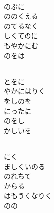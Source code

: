 \documentclass[10pt,b5j]{tarticle} %
\begin{document}
\vspace{1.5em} %
\newcommand{\linespace}{0.5em} %
\newcommand{\blocksize}{0.5\hsize} %
\newcommand{\itemmargin}{3em} %
\begin{enumerate} %
    \setlength{\itemindent}{\itemmargin} %
    \begin{minipage}[c]{\blocksize}
    
        \vspace{\linespace}
        \item~\\
        のぶに\\
        ののくえる\\
        のてるなく\\
        しくてのに\\
        もやかにむ\\
        のをは
        
    \end{minipage}
    \begin{minipage}[c]{\blocksize}
        
        \vspace{\linespace}
        \item~\\
        とをに\\
        やかにはりく\\
        をしのを\\
        にったに\\
        のをし\\
        かしいを
        
    \end{minipage}
    \begin{minipage}[c]{\blocksize}
        
        \vspace{\linespace}
        \item~\\
        にく\\
        ましくいのる\\
        のれちて\\
        からる\\
        はもうくなりく\\
        のの
        

\end{minipage}
\end{enumerate}
\end{document}
